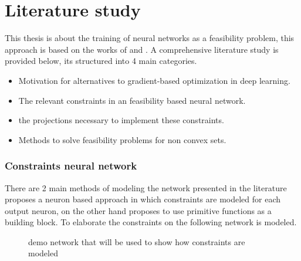 \chapter{Literature study}
This thesis is about the training of neural networks as a feasibility problem, this approach is based on the works of \citet{elser2019learning} and \citet{bergmeister2025projection}. A comprehensive literature study is provided below, its structured into 4 main categories.
\begin{itemize}
    \item Motivation for alternatives to gradient-based optimization in deep learning.
    \item The relevant constraints in an feasibility based neural network.
    \item the projections necessary to implement these constraints.
    \item Methods to solve feasibility problems for non convex sets.
\end{itemize}
\subsection{Constraints neural network}
There are 2 main methods of modeling the network presented in the literature \citet{elser2019learning} proposes a neuron based approach in which constraints are modeled for each output neuron, \cite{bergmeister2025projection} on the other hand proposes to use primitive functions as a building block. To elaborate the constraints on the following network is modeled.
\begin{figure}[h!]
  \centering
     
    \caption{demo network that will be used to show how constraints are modeled}
    \label{fig:demo-network}
\end{figure}
